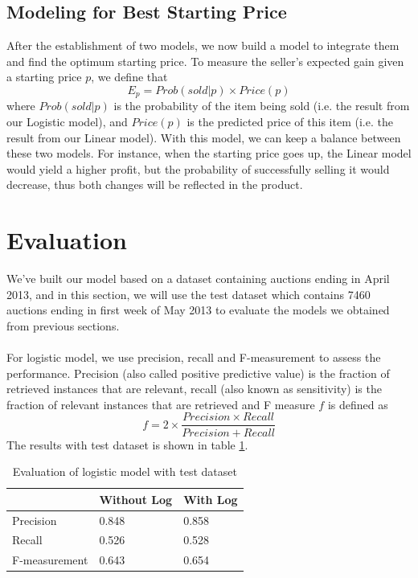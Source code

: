 \documentclass[CEJM,PDF]{cej} %
\begin{document}
\subsection{Modeling for Best Starting Price}
After the establishment of two models, we now build a model to integrate them and find the optimum starting price. To measure the seller's expected gain given a starting price $p$, we define that
$$E_p = Prob(sold | p) \times Price(p)$$
where $Prob(sold | p)$ is the probability of the item being sold (i.e. the result from our Logistic model), and $Price(p)$ is the predicted price of this item (i.e. the result from our Linear model). 
With this model, we can keep a balance between these two models. For instance, when the starting price goes up, the Linear model would yield a higher profit, but the probability of successfully selling it would decrease, thus both changes will be reflected in the product.\\

\section{Evaluation}
We've built our model based on a dataset containing auctions ending in April 2013, and in this section, we will use the test dataset which contains 7460 auctions ending in first week of May 2013 to evaluate the models we obtained from previous sections. \\
\\
For logistic model, we use precision, recall and F-measurement to assess the performance. Precision (also called positive predictive value) is the fraction of retrieved instances that are relevant, recall (also known as sensitivity) is the fraction of relevant instances that are retrieved and F measure $f$ is defined as 
$$f=2\times\frac{Precision\times Recall}{Precision+Recall}$$
The results with test dataset is shown in table \ref{logit}.

\begin{table}[h]
\centering
\caption{Evaluation of logistic model with test dataset}
\label{logit}
\begin{tabular}{@{}|l|l|l|@{}}
\toprule
\hline
  & Without Log & With Log \\
\hline
Precision  & 0.848 & 0.858 \\ \midrule
\hline
Recall  & 0.526 & 0.528  \\
\hline
F-measurement  &  0.643 & 0.654\\ \bottomrule
\hline
\end{tabular}
\end{table}
\end{document}

